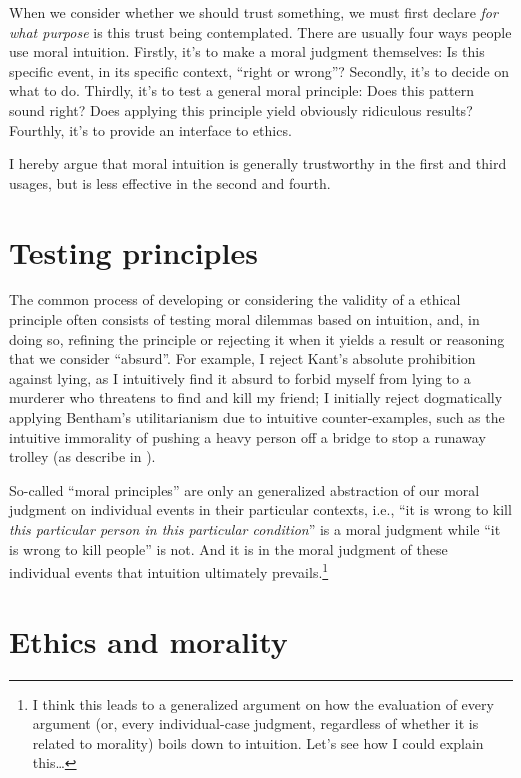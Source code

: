 \documentclass{scrartcl}
\begin{document}
\bigskip

When we consider whether we should trust something, we must first declare \emph{for what purpose} is this trust being contemplated. There are usually four ways people use moral intuition. Firstly, it's to make a moral judgment themselves: Is this specific event, in its specific context, ``right or wrong''? Secondly, it's to decide on what to do. Thirdly, it's to test a general moral principle: Does this pattern sound right? Does applying this principle yield obviously ridiculous results? Fourthly, it's to provide an interface to ethics.

I hereby argue that moral intuition is generally trustworthy in the first and third usages, but is less effective in the second and fourth. %

\section{Testing principles}

The common process of developing or considering the validity of a ethical principle often consists of testing moral dilemmas based on intuition, and, in doing so, refining the principle or rejecting it when it yields a result or reasoning that we consider ``absurd''. For example, I reject Kant's absolute prohibition against lying, as I intuitively find it absurd to forbid myself from lying to a murderer who threatens to find and kill my friend; I initially reject dogmatically applying Bentham's utilitarianism due to intuitive counter-examples, such as the intuitive immorality of pushing a heavy person off a bridge to stop a runaway trolley (as describe in \autocite[21]{justice}).

So-called ``moral principles'' are only an generalized abstraction of our moral judgment on individual events in their particular contexts, i.e., ``it is wrong to kill \emph{this particular person in this particular condition}'' is a moral judgment while ``it is wrong to kill people'' is not. And it is in the moral judgment of these individual events that intuition ultimately prevails.\footnote{I think this leads to a generalized argument on how the evaluation of every argument (or, every individual-case judgment, regardless of whether it is related to morality) boils down to intuition. Let's see how I could explain this\ldots{}}
 
\section{Ethics and morality}
\end{document}
